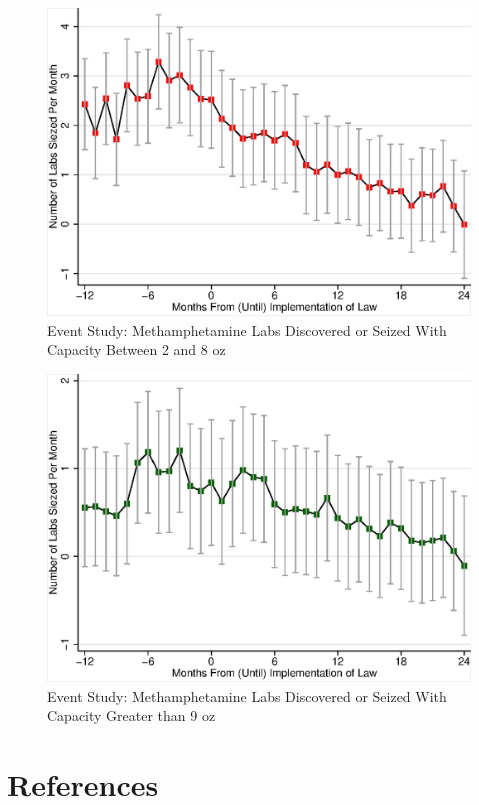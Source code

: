 \documentclass[
  11pt,
]{article}
\begin{document}
\begin{figure}[H]
 \centering
 \includegraphics{confidence-interval-plot-for-cap_2_8_oz.eps}
 \caption{Event Study: Methamphetamine Labs Discovered or Seized With Capacity Between 2 and 8 oz}
\label{ci-cap2-8}
\end{figure}

\begin{figure}[H]
 \centering
 \includegraphics{confidence-interval-plot-for-cap_above_9_oz.eps}
 \caption{Event Study: Methamphetamine Labs Discovered or Seized With Capacity Greater than 9 oz}
\label{ci-cap9}
\end{figure}

\newpage

\hypertarget{references}{%
\section*{References}\label{references}}
\end{document}
